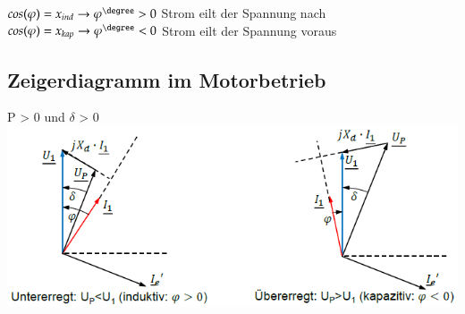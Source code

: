     \begin{minipage}{0.5\linewidth}
        $ cos(\varphi) = x_{ind} \rightarrow \varphi^\degree >0 $ Strom eilt der Spannung nach\newline
        $ cos(\varphi) = x_{kap} \rightarrow \varphi^\degree <0 $ Strom eilt der Spannung voraus\newline
    \end{minipage}
\subsection{Zeigerdiagramm im Motorbetrieb}
    P > 0 und $\delta$ > 0 \newline \newline
    \includegraphics[width = 14 cm]{images/ZeigerdiagrammSynchronmaschine}

